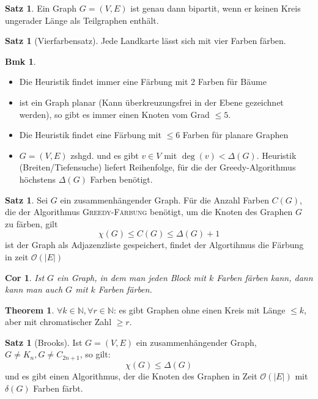 \documentclass[a4paper, 10pt]{article}
\newtheorem*{corollary}{Cor}
\theoremstyle{definition}
\newtheorem{theorem}[definition]{Satz}
\newtheorem*{note}{Bmk}
\newtheorem*{theorem*}{Theorem}
\theoremstyle{named}
\newcommand{\N}{\mathbb{N}}
\newcommand{\BO}{\mathcal{O}}
\begin{document}
\setcounter{definition}{57}
\begin{theorem}
    Ein Graph $G = (V, E)$ ist genau dann bipartit, wenn er keinen Kreis ungerader Länge als Teilgraphen enthält.
\end{theorem}

\begin{theorem}[Vierfarbensatz]
    Jede Landkarte lässt sich mit vier Farben färben.
\end{theorem}

\begin{note}
    \begin{itemize}
        \item Die Heuristik findet immer eine Färbung mit 2 Farben für Bäume
        \item ist ein Graph planar (Kann überkreuzungsfrei in der Ebene gezeichnet werden), so gibt es immer einen Knoten vom Grad $\leq 5$.
        \item Die Heuristik findet eine Färbung mit $\leq 6$ Farben für planare Graphen
        \item $G = (V, E)$ zshgd. und es gibt $v \in V$ mit $\deg(v) < \Delta(G)$. Heuristik (Breiten/Tiefensuche) liefert Reihenfolge, für die der Greedy-Algorithmus höchstens $\Delta(G)$ Farben benötigt.
    \end{itemize}
\end{note}

\begin{theorem}
    Sei $G$ ein zusammenhängender Graph. Für die Anzahl Farben $C(G)$, die der Algorithmus \textsc{Greedy-Färbung} benötigt, um die Knoten des Graphen $G$ zu färben, gilt
    $$\chi(G) \leq C(G) \leq \Delta(G) + 1$$
    ist der Graph als Adjazenzliste gespeichert, findet der Algortihmus die Färbung in zeit $\BO(|E|)$
\end{theorem}

\begin{corollary}
    Ist $G$ ein Graph, in dem man jeden Block mit $k$ Farben färben kann, dann kann man auch $G$ mit $k$ Farben färben.
\end{corollary}

\begin{theorem*}
    $\forall k \in \N, \forall r \in \N$: es gibt Graphen ohne einen Kreis mit Länge $\leq k$, aber mit chromatischer Zahl $\geq r$.
\end{theorem*}

\setcounter{definition}{63}
\begin{theorem}[Brooks]
    Ist $G = (V, E)$ ein zusammenhängender Graph, $G \neq K_n, G \neq C_{2n + 1}$, so gilt:
    $$\chi(G) \leq \Delta(G)$$
    und es gibt einen Algorithmus, der die Knoten des Graphen in Zeit $\BO(|E|)$ mit $\delta(G)$ Farben färbt.
\end{theorem}
\end{document}
